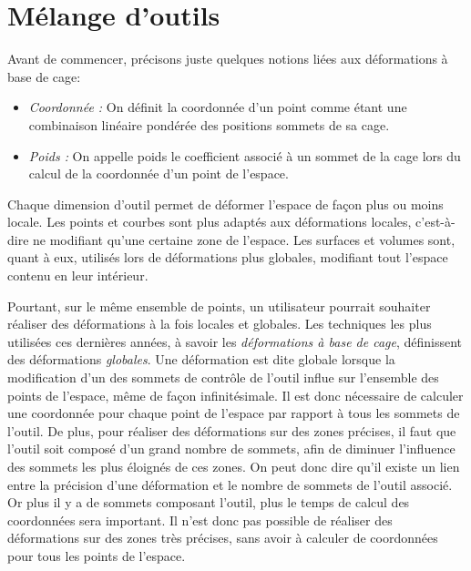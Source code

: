 
\chapter{Mélange d'outils}

\graphicspath{ {Chapter2/Chapter2Figs/PNG/}
  {Chapter2/Chapter2Figs/PDF/} {Chapter2/Chapter2Figs/} }

Avant de commencer, précisons juste quelques notions liées aux
déformations à base de cage:
\begin{itemize}
\item{\textit{Coordonnée :}} On définit la coordonnée d'un point comme
  étant une combinaison linéaire pondérée des positions sommets de sa
  cage.
\item{\textit{Poids :}} On appelle poids le coefficient associé à un
  sommet de la cage lors du calcul de la coordonnée d'un point de
  l'espace.\\
\end{itemize}

Chaque dimension d'outil permet de déformer l'espace de façon plus ou
moins locale. Les points et courbes sont plus adaptés aux déformations
locales, c'est-à-dire ne modifiant qu'une certaine zone de
l'espace. Les surfaces et volumes sont, quant à eux, utilisés lors de
déformations plus globales, modifiant tout l'espace contenu en leur
intérieur.

Pourtant, sur le même ensemble de points, un utilisateur pourrait
souhaiter réaliser des déformations à la fois locales et globales. Les
techniques les plus utilisées ces dernières années, à savoir les
\textit{déformations à base de cage}, définissent des déformations
\textit{globales}. Une déformation est dite globale lorsque la
modification d'un des sommets de contrôle de l'outil influe sur
l'ensemble des points de l'espace, même de façon infinitésimale. Il
est donc nécessaire de calculer une coordonnée pour chaque point de
l'espace par rapport à tous les sommets de l'outil. De plus, pour
réaliser des déformations sur des zones précises, il faut que l'outil
soit composé d'un grand nombre de sommets, afin de diminuer
l'influence des sommets les plus éloignés de ces zones. On peut donc
dire qu'il existe un lien entre la précision d'une déformation et le
nombre de sommets de l'outil associé. Or plus il y a de sommets
composant l'outil, plus le temps de calcul des coordonnées sera
important. Il n'est donc pas possible de réaliser des déformations sur
des zones très précises, sans avoir à calculer de coordonnées pour
tous les points de l'espace.

